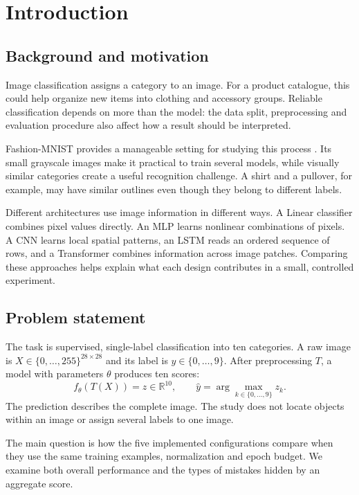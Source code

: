 \section{Introduction}
\label{sec:introduction}
\subsection{Background and motivation}
Image classification assigns a category to an image. For a product catalogue,
this could help organize new items into clothing and accessory groups.
Reliable classification depends on more than the model: the data split,
preprocessing and evaluation procedure also affect how a result should be
interpreted.

Fashion-MNIST provides a manageable setting for studying this process
\cite{fresh_fashion}. Its small grayscale images make it practical to train
several models, while visually similar categories create a useful recognition
challenge. A shirt and a pullover, for example, may have similar outlines even
though they belong to different labels.

Different architectures use image information in different ways. A Linear
classifier combines pixel values directly. An MLP learns nonlinear combinations
of pixels. A CNN learns local spatial patterns, an LSTM reads an ordered sequence
of rows, and a Transformer combines information across image patches.
Comparing these approaches helps explain what each design contributes in a
small, controlled experiment.

\subsection{Problem statement}
The task is supervised, single-label classification into ten categories.
A raw image is $X\in\{0,\ldots,255\}^{28\times28}$ and its label is
$y\in\{0,\ldots,9\}$. After preprocessing $T$, a model with parameters $\theta$
produces ten scores:
\[
f_\theta(T(X))=z\in\mathbb{R}^{10},
\qquad \hat y=\arg\max_{k\in\{0,\ldots,9\}}z_k.
\]
The prediction describes the complete image. The study does not locate objects
within an image or assign several labels to one image.

The main question is how the five implemented configurations compare when they
use the same training examples, normalization and epoch budget. We examine both
overall performance and the types of mistakes hidden by an aggregate score.

